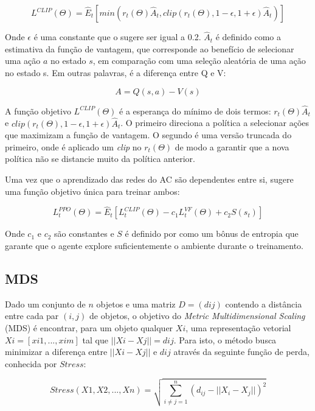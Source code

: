 \begin{equation}
   L^{CLIP}(\Theta) = \hat{E}_t [min(r_t (\Theta) \hat{A}_t, clip(r_t (\Theta), 1-\epsilon, 1+\epsilon) \hat{A}_t)]
\end{equation}

\noindent
Onde $\epsilon$ é uma constante que o \cite{PPO} sugere ser igual a 0.2. $\hat{A}_t$ é definido como a estimativa da função de vantagem, que corresponde ao benefício de selecionar uma ação $a$ no estado $s$, em comparação com uma seleção aleatória de uma ação no estado s. Em outras palavras, é a diferença entre Q e V:

\begin{equation}
   A = Q(s,a) - V(s)
\end{equation}

A função objetivo $L^{CLIP}(\Theta)$ é a esperança do mínimo de dois termos: $r_t(\Theta) \hat{A}_t$ e $clip(r_t (\Theta), 1-\epsilon, 1+\epsilon) \hat{A}_t$. O primeiro direciona a política a selecionar ações que maximizam a função de vantagem. O segundo é uma versão truncada do primeiro, onde é aplicado um \textit{clip} no $r_t(\Theta)$ de modo a garantir que a nova política não se distancie muito da política anterior. 

Uma vez que o aprendizado das redes do AC são dependentes entre si, \cite{PPO} sugere uma função objetivo única para treinar ambos:

\begin{equation}
   L_t ^{PPO} (\Theta) = \hat{E}_t[L_t ^{CLIP} (\Theta) - c_1 L_t ^{VF} (\Theta) + c_2 S(s_t)]
\end{equation}

Onde $c_1$ e $c_2$ são constantes e $S$ é definido por \cite{PPO} como um bônus de entropia que garante que o agente explore suficientemente o ambiente durante o treinamento.

\subsection{MDS}
\label{subsection:MDS}
Dado um conjunto de $n$ objetos e uma matriz $D = (dij)$ contendo a distância entre cada par $(i,j)$ de objetos, o objetivo do \textit{Metric Multidimensional Scaling} (MDS) é encontrar, 
para um objeto qualquer $Xi$, uma representação vetorial $Xi = [xi1,...,xim]$ tal que $||Xi - Xj|| = dij$.
Para isto, o método busca minimizar a diferença entre $||Xi - Xj||$ e $dij$ através da seguinte função de perda, conhecida por $Stress$:

\begin{equation}
    Stress(X1, X2, ..., Xn) = \sqrt{\sum_{i \neq j = 1}^{n} (d_{ij} - ||X_i - X_j||)^2}
 \end{equation}

